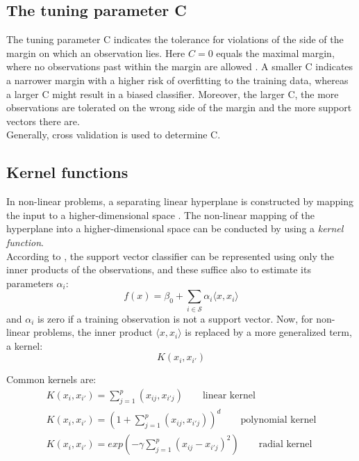 \documentclass[a4paper, 11pt]{article}
\begin{document}
\subsection{The tuning parameter C}

The tuning parameter C indicates the tolerance for violations of the side of the margin on which an observation lies. Here $C=0$ equals the maximal margin, where no observations past within the margin are allowed \citep{James.2013}. A smaller C indicates a narrower margin with a higher risk of overfitting to the training data, whereas a larger C might result in a biased classifier. Moreover, the larger C, the more observations are tolerated on the wrong side of the margin and the more support vectors there are.\\
Generally, cross validation is used to determine C.

\subsection{Kernel functions}
In non-linear problems, a separating linear hyperplane is constructed by mapping the input to a higher-dimensional space \citep{Adhikari.2015}.
The non-linear mapping of the hyperplane into a higher-dimensional space can be conducted by using a \textit{kernel function}. \\
According to \cite{James.2013}, the support vector classifier can be represented using only the inner products of the observations, and these suffice also to estimate its parameters $\alpha_{i}$:
\begin{equation}
	f(x) = \beta_{0} + \sum_{i \in \mathcal{S}}\alpha_{i}\langle x,x_{i}\rangle
\end{equation}
and $\alpha_{i}$ is zero if a training observation is not a support vector.
Now, for non-linear problems, the inner product $\langle x,x_{i}\rangle$ is replaced by a more generalized term, a kernel:
\begin{equation}
	K(x_{i},x_{i'})
\end{equation}

 Common kernels are:\\
\begin{align}
	K(x_{i},x_{i'}) = \sum_{j=1}^{p}(x_{ij},x_{i'j}) \qquad \text{linear kernel}\\
	K(x_{i},x_{i'}) = (1 + \sum_{j=1}^{p}(x_{ij},x_{i'j}))^{d} \qquad \text{polynomial kernel}\\
	K(x_{i},x_{i'}) = exp(-\gamma\sum_{j=1}^{p}(x_{ij}-x_{i'j})^{2}) \qquad \text{radial kernel}
\end{align}
\end{document}

